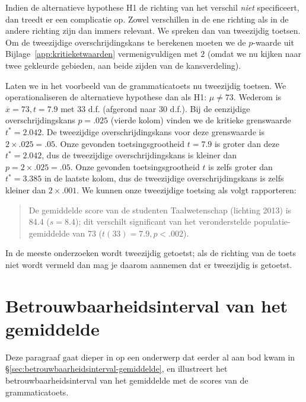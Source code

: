 \documentclass[
]{book}
\begin{document}
Indien de alternatieve hypothese H1 de richting van het verschil \emph{niet}
specificeert, dan treedt er een complicatie op. Zowel verschillen in de
ene richting als in de andere richting zijn dan immers relevant. We
spreken dan van tweezijdig toetsen. Om de tweezijdige
overschrijdingskans te berekenen moeten we de \(p\)-waarde uit
Bijlage~\ref{app:kritieketwaarden} vermenigvuldigen met \(2\) (omdat we nu
kijken naar twee gekleurde gebieden, aan beide zijden van de
kansverdeling).

Laten we in het voorbeeld van de grammaticatoets nu tweezijdig toetsen.
We operationaliseren de alternatieve hypothese dan als H1: \(\mu \ne 73\).
Wederom is \(\overline{x}=73, t=7.9\) met 33 d.f. (afgerond naar 30 d.f.).
Bij de eenzijdige overschrijdingskans \(p=.025\) (vierde kolom) vinden we
de kritieke grenswaarde \(t^*=2.042\). De tweezijdige overschrijdingskans
voor deze grenswaarde is \(2 \times .025 = .05\). Onze gevonden
toetsingsgrootheid \(t=7.9\) is groter dan deze \(t^*=2.042\), dus de
tweezijdige overschrijdingskans is kleiner dan \(p=2\times.025=.05\). Onze
gevonden toetsingsgrootheid \(t\) is zelfs groter dan \(t^*=3.385\) in de
laatste kolom, dus de tweezijdige overschrijdingskans is zelfs kleiner
dan \(2\times.001\). We kunnen onze tweezijdige toetsing als volgt
rapporteren:

\begin{quote}
De gemiddelde score van de studenten Taalwetenschap (lichting 2013) is
84.4 (\(s=8.4\)); dit verschilt significant van het veronderstelde
populatie-gemiddelde van 73 (\(t(33)=7.9, p<.002\)).
\end{quote}

In de meeste onderzoeken wordt tweezijdig getoetst; als de richting van
de toets niet wordt vermeld dan mag je daarom aannemen dat er tweezijdig
is getoetst.

\hypertarget{sec:t-betrouwbaarheidsinterval-gemiddelde}{%
\section{Betrouwbaarheidsinterval van het gemiddelde}\label{sec:t-betrouwbaarheidsinterval-gemiddelde}}

Deze paragraaf gaat dieper in op een onderwerp dat eerder al aan bod kwam in §\ref{sec:betrouwbaarheidsinterval-gemiddelde}, en illustreert het betrouwbaarheidsinterval van het gemiddelde met de scores van de grammaticatoets.
\end{document}
